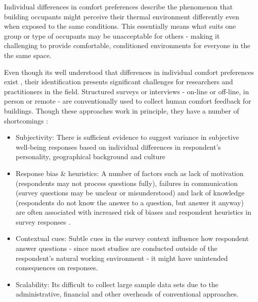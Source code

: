 

Individual differences in comfort preferences describe the phenomenon that building occupants might perceive their thermal environment differently even when exposed to the same conditions. This essentially means what suits one group or type of occupants may be unacceptable for others - making it challenging to provide comfortable, conditioned environments for everyone in the the same space.

Even though its well understood that differences in individual comfort preferences exist \cite{WANG2018181}, their identification presents significant challenges for researchers and practitioners in the field. Structured surveys or interviews - on-line or off-line, in person or remote - are conventionally used to collect human comfort feedback for buildings. Though these approaches work in principle, they have a number of shortcomings \cite{organisationforeconomicco-operationanddevelopment(oecd)_2013}:  

\begin{itemize}
  \item Subjectivity: There is sufficient evidence to suggest variance in subjective well-being responses based on individual differences in respondent's personality, geographical background and culture \cite{doi:10.1146/annurev.psych.54.101601.145056}
  \item Response bias \& heuristics: A number of factors such as lack of motivation (respondents may not process questions fully), failures in communication (survey questions may be unclear or misunderstood) and lack of knowledge (respondents do not know the answer to a question, but answer it anyway) are often associated with increased risk of biases and respondent heuristics in survey responses \cite{bradburn2004asking}.
  \item Contextual cues: Subtle cues in the survey context influence how respondent answer questions \cite{krosnick1997seymour} - since most studies are conducted outside of the respondent's natural working environment - it might have unintended consequences on responses. 
  \item Scalability: Its difficult to collect large sample data sets due to the administrative, financial and other overheads of conventional approaches.
\end{itemize}


